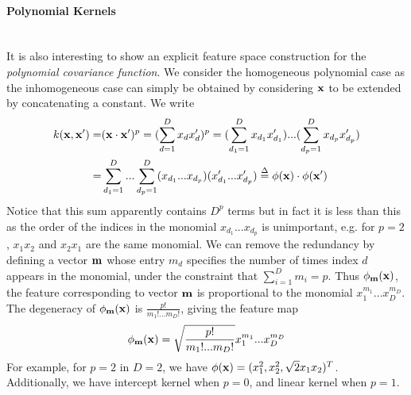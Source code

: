 \documentclass[11pt]{article}
\begin{document}
\paragraph{Polynomial Kernels}\mbox{}\\
It is also interesting to show an explicit feature space construction for the \textsl{polynomial covariance function}. We consider the homogeneous polynomial case as the inhomogeneous case can simply be obtained by considering ${\bf x}$ to be extended by concatenating a constant. We write
\begin{align*}
k({\bf x}, {\bf x}')=&({\bf x} \cdot {\bf x}')^p=(\sum_{d=1}^D x_d x'_d)^p=(\sum_{d_1=1}^D x_{d_1} x'_{d_1})...(\sum_{d_p=1}^D x_{d_p} x'_{d_p})\\
=&\sum_{d_1=1}^D...\sum_{d_p=1}^D(x_{d_1}...x_{d_p})(x'_{d_1}...x'_{d_p})\overset{\Delta}=\phi({\bf x})\cdot \phi({\bf x}')
\end{align*}
Notice that this sum apparently contains $D^p$ terms but in fact it is less than this as the order of the indices in the monomial $x_{d_1}...x_{d_p}$ is unimportant, e.g. for $p=2$, $x_1x_2$ and $x_2x_1$ are the same monomial. We can remove the redundancy by defining a vector ${\bf m}$ whose entry $m_d$ specifies the number of times index $d$ appears in the monomial, under the constraint that $\sum_{i=1}^D m_i=p$. Thus $\phi_{\bf m}({\bf x})$, the feature corresponding to vector ${\bf m}$ is proportional to the monomial $x_1^{m_1}...x_D^{m_D}$. The degeneracy of $\phi_{\bf m}({\bf x})$ is $\frac{p!}{m_1!...m_D!}$, giving the feature map
\begin{align*}
\phi_{\bf m}({\bf x})=\sqrt{\frac{p!}{m_1!...m_D!}}x_1^{m_1}...x_D^{m_D}
\end{align*}
For example, for $p=2$ in $D=2$, we have $\phi({\bf x})=(x_1^2, x_2^2, \sqrt{2}x_1x_2)^T$.\\
Additionally, we have intercept kernel when $p=0$, and linear kernel when $p=1$.
\end{document}
